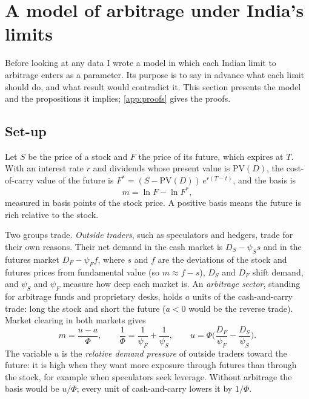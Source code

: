 \section{A model of arbitrage under India's limits}\label{sec:model}

Before looking at any data I wrote a model in which each Indian limit to arbitrage enters as a parameter. Its purpose is
to say in advance what each limit should do, and what result would contradict it. This section presents the model and
the propositions it implies; \cref{app:proofs} gives the proofs.

\subsection{Set-up}
Let $S$ be the price of a stock and $F$ the price of its future, which expires at $T$. With an interest rate $r$ and
dividends whose present value is $\mathrm{PV}(D)$, the cost-of-carry value of the future is
$F^*=(S-\mathrm{PV}(D))\,e^{r(T-t)}$, and the basis is
\begin{equation}\label{eq:basis}
m=\ln F-\ln F^* ,
\end{equation}
measured in basis points of the stock price. A positive basis means the future is rich relative to the stock.

Two groups trade. \emph{Outside traders}, such as speculators and hedgers, trade for their own reasons. Their net demand
in the cash market is $D_S-\psi_S s$ and in the futures market $D_F-\psi_F f$, where $s$ and $f$ are the deviations of
the stock and futures prices from fundamental value (so $m\approx f-s$), $D_S$ and $D_F$ shift demand, and $\psi_S$ and
$\psi_F$ measure how deep each market is. An \emph{arbitrage sector}, standing for arbitrage funds and proprietary
desks, holds $a$ units of the cash-and-carry trade: long the stock and short the future ($a<0$ would be the reverse
trade). Market clearing in both markets gives
\begin{equation}\label{eq:clear}
m=\frac{u-a}{\Phi},\qquad \frac{1}{\Phi}=\frac{1}{\psi_F}+\frac{1}{\psi_S},\qquad
u=\Phi\Big(\frac{D_F}{\psi_F}-\frac{D_S}{\psi_S}\Big).
\end{equation}
The variable $u$ is the \emph{relative demand pressure} of outside traders toward the future: it is high when they want
more exposure through futures than through the stock, for example when speculators seek leverage. Without arbitrage
the basis would be $u/\Phi$; every unit of cash-and-carry lowers it by $1/\Phi$.

